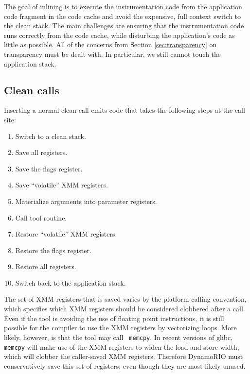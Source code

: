 The goal of inlining is to execute the instrumentation code from the application
code fragment in the code cache and avoid the expensive, full context switch to
the clean stack.  The main challenges are ensuring that the instrumentation code
runs correctly from the code cache, while disturbing the application's code as
little as possible.  All of the concerns from Section \ref{sec:transparency} on
transparency must be dealt with.  In particular, we still cannot touch the
application stack.

\subsection{Clean calls}


Inserting a normal clean call emits code that takes the following steps at the
call site:

\begin{enumerate}
\item Switch to a clean stack.
\item Save all registers.
\item Save the flags register.
\item Save ``volatile'' XMM registers.
\item Materialize arguments into parameter registers.
\item Call tool routine.
\item Restore ``volatile'' XMM registers.
\item Restore the flags register.
\item Restore all registers.
\item Switch back to the application stack.
\end{enumerate}

The set of XMM registers that is saved varies by the platform calling
convention, which specifies which XMM registers should be considered clobbered
after a call.  Even if the tool is avoiding the use of floating point
instructions, it is still possible for the compiler to use the XMM registers by
vectorizing loops.  More likely, however, is that the tool may call {\tt
memcpy}.  In recent versions of glibc, {\tt memcpy} will make use of the XMM
registers to widen the load and store width, which will clobber the caller-saved
XMM registers.  Therefore DynamoRIO must conservatively save this set of
registers, even though they are most likely unused.

